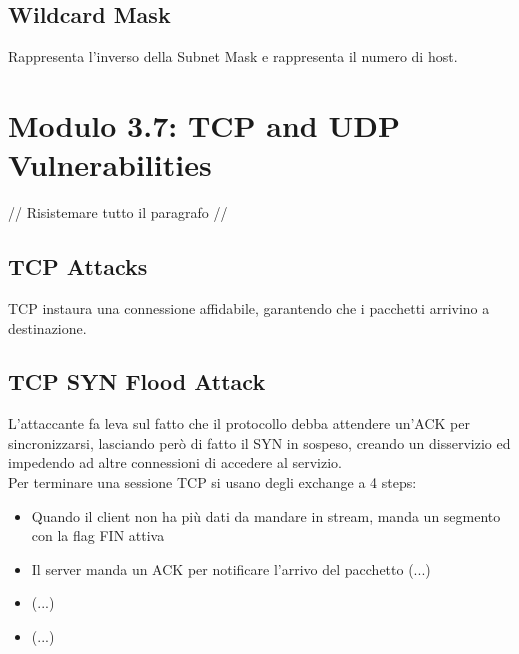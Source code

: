 \documentclass[12pt, a4paper]{article}
\begin{document}
	\subsection*{Wildcard Mask}
	
	Rappresenta l'inverso della Subnet Mask e rappresenta il numero di host.
	
	
	\section*{Modulo 3.7: TCP and UDP Vulnerabilities}
	// Risistemare tutto il paragrafo //
	\subsection*{TCP Attacks}
	TCP instaura una connessione affidabile, garantendo che i pacchetti arrivino a destinazione. \\
	\subsection*{TCP SYN Flood Attack}
	L'attaccante fa leva sul fatto che il protocollo debba attendere un'ACK per sincronizzarsi, lasciando però di fatto il SYN in sospeso, creando un disservizio ed impedendo ad altre connessioni di accedere al servizio. \\
	Per terminare una sessione TCP si usano degli exchange a 4 steps:
	\begin{itemize}
		\item Quando il client non ha più dati da mandare in stream, manda un segmento con la flag FIN attiva
		\item Il server manda un ACK per notificare l'arrivo del pacchetto (...)
		\item (...)
		\item (...)
	\end{itemize}


	
	
\end{document}
